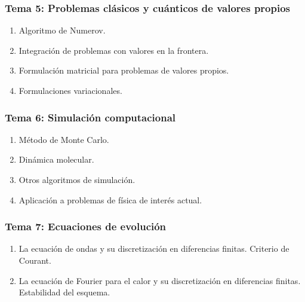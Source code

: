 \documentclass[12pt]{beamer}
\begin{document}
\begin{frame}
\frametitle{\textbf{Tema 5: Problemas clásicos y cuánticos de valores propios}}
\begin{enumerate}
\item Algoritmo de Numerov.
\item Integración de problemas con valores en la frontera.
\item Formulación matricial para problemas de valores propios.
\item Formulaciones variacionales.
\end{enumerate}
\end{frame}
\begin{frame}
\frametitle{\textbf{Tema 6: Simulación computacional}}
\begin{enumerate}
\item Método de Monte Carlo.
\item Dinámica molecular.
\item Otros algoritmos de simulación.
\item Aplicación a problemas de física de interés actual.
\end{enumerate}
\end{frame}
\begin{frame}
\frametitle{\textbf{Tema 7: Ecuaciones de evolución}}
\begin{enumerate}
\item La ecuación de ondas y su discretización en diferencias finitas. Criterio de Courant.
\item La ecuación de Fourier para el calor y su discretización en diferencias finitas. Estabilidad del esquema.
\end{enumerate}
\end{frame}
\end{document}
